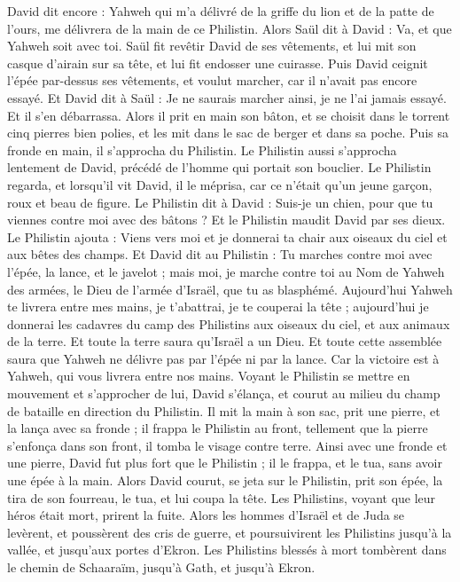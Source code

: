 \begin{multicols}{2}
David dit encore : Yahweh qui m'a délivré de la griffe du lion et de la patte de l'ours, me délivrera de la main de ce Philistin. Alors Saül dit à David : Va, et que Yahweh soit avec toi.
Saül fit revêtir David de ses vêtements, et lui mit son casque d'airain sur sa tête, et lui fit endosser une cuirasse.
Puis David ceignit l'épée par-dessus ses vêtements, et voulut marcher, car il n'avait pas encore essayé. Et David dit à Saül : Je ne saurais marcher ainsi, je ne l'ai jamais essayé. Et il s'en débarrassa.
Alors il prit en main son bâton, et se choisit dans le torrent cinq pierres bien polies, et les mit dans le sac de berger et dans sa poche. Puis sa fronde en main, il s'approcha du Philistin.
Le Philistin aussi s'approcha lentement de David, précédé de l'homme qui portait son bouclier.
Le Philistin regarda, et lorsqu'il vit David, il le méprisa, car ce n'était qu'un jeune garçon, roux et beau de figure.
Le Philistin dit à David : Suis-je un chien, pour que tu viennes contre moi avec des bâtons ? Et le Philistin maudit David par ses dieux.
Le Philistin ajouta : Viens vers moi et je donnerai ta chair aux oiseaux du ciel et aux bêtes des champs.
Et David dit au Philistin : Tu marches contre moi avec l'épée, la lance, et le javelot ; mais moi, je marche contre toi au Nom de Yahweh des armées, le Dieu de l'armée d'Israël, que tu as blasphémé.
Aujourd'hui Yahweh te livrera entre mes mains, je t'abattrai, je te couperai la tête ; aujourd'hui je donnerai les cadavres du camp des Philistins aux oiseaux du ciel, et aux animaux de la terre. Et toute la terre saura qu'Israël a un Dieu.
Et toute cette assemblée saura que Yahweh ne délivre pas par l'épée ni par la lance. Car la victoire est à Yahweh, qui vous livrera entre nos mains.
Voyant le Philistin se mettre en mouvement et s'approcher de lui, David s'élança, et courut au milieu du champ de bataille en direction du Philistin.
Il mit la main à son sac, prit une pierre, et la lança avec sa fronde ; il frappa le Philistin au front, tellement que la pierre s'enfonça dans son front, il tomba le visage contre terre.
Ainsi avec une fronde et une pierre, David fut plus fort que le Philistin ; il le frappa, et le tua, sans avoir une épée à la main.
Alors David courut, se jeta sur le Philistin, prit son épée, la tira de son fourreau, le tua, et lui coupa la tête. Les Philistins, voyant que leur héros était mort, prirent la fuite.
Alors les hommes d'Israël et de Juda se levèrent, et poussèrent des cris de guerre, et poursuivirent les Philistins jusqu'à la vallée, et jusqu'aux portes d'Ekron. Les Philistins blessés à mort tombèrent dans le chemin de Schaaraïm, jusqu'à Gath, et jusqu'à Ekron.

\end{multicols}
